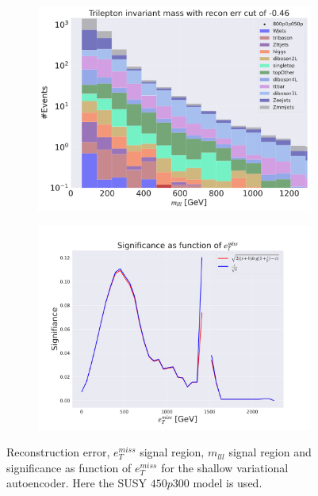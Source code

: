 \begin{figure}[H]
    \hfill
    \begin{subfigure}{.40\textwidth}
        \includegraphics[width=\textwidth]{Figures/VAE_testing/small/3lep/b_data_recon_big_rm3_feats_sig_800p0p050p_mlll_recon_errcut_-0.46.pdf}
        \caption{}
        \label{fig:VAE_3lep_small_mlll_800_3}
    \end{subfigure}
    \hfill   
    \begin{subfigure}{.40\textwidth}
        \includegraphics[width=\textwidth]{Figures/VAE_testing/small/3lep/significance_etmiss_800p0p050p_-0.4571280959445052.pdf}
        \caption{}
        \label{fig:VAE_3lep_small_signi_800_3}
    \end{subfigure}
    \hfill      
    \caption[3lep shallow network | $800p50$ | VAE | 3]{Reconstruction error, $e_T^{miss}$ signal region, $m_{lll}$ signal region and significance as function of 
    $e_T^{miss}$ for the shallow variational autoencoder. Here the SUSY $450p300$ model is used.}
    \label{fig:VAE_3lep_small_rec_sig_signi_800_3}
\end{figure}

